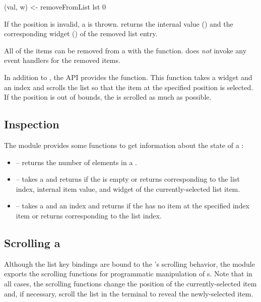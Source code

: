 \begin{haskellcode}
 (val, w) <- removeFromList lst 0
\end{haskellcode}

If the position is invalid, a  is thrown.
 returns the internal value () and the
corresponding widget () of the removed list entry.

All of the items can be removed from a  with the
 function.   does \textit{not} invoke any
event handlers for the removed items.

In addition to , the  API provides the
 function.  This function takes a  widget and
an index and scrolls the list so that the item at the specified
position is selected.  If the position is out of bounds, the 
is scrolled as much as possible.

\subsection{ Inspection}

The  module provides some functions to get information about
the state of a :

\begin{itemize}
\item {} -- returns the number of elements in a
  .
\item {} -- takes a  and returns
   if the  is empty or returns  corresponding to the list index, internal item
  value, and widget of the currently-selected list item.
\item {} -- takes a  and an index
  and returns  if the  has no item at the
  specified index item or returns 
  corresponding to the list index.
\end{itemize}

\subsection{Scrolling a }
\label{sec:list_scrolling}

Although the list key bindings are bound to the 's scrolling
behavior, the  module exports the scrolling functions for
programmatic manipulation of s.  Note that in all cases, the
scrolling functions change the position of the currently-selected item
and, if necessary, scroll the list in the terminal to reveal the
newly-selected item.

